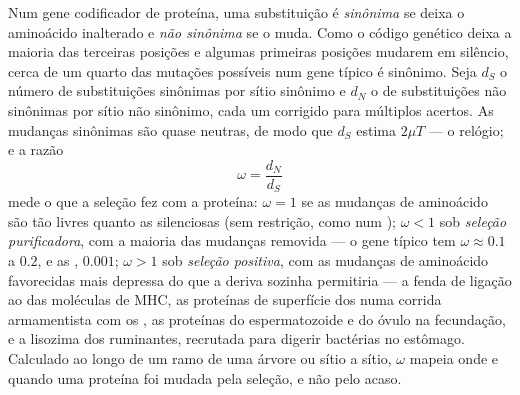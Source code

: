 \begin{definition}[dN/dS]\label{def:b3:molecular-evolution:dnds}
Num gene codificador de proteína, uma substituição é \emph{sinônima} se
deixa o aminoácido inalterado e \emph{não sinônima} se o muda. Como o
código genético deixa a maioria das terceiras posições e algumas
primeiras posições mudarem em silêncio, cerca de um quarto das mutações
possíveis num gene típico é sinônimo. Seja $d_{S}$ o número de
substituições sinônimas por sítio sinônimo e $d_{N}$ o de substituições
não sinônimas por sítio não sinônimo, cada um corrigido para múltiplos
acertos. As mudanças sinônimas são quase neutras, de modo que $d_{S}$
estima $2\mu T$ --- o relógio; e a razão
\[
\omega = \frac{d_{N}}{d_{S}}
\]
mede o que a seleção fez com a proteína: $\omega = 1$ se as mudanças de
aminoácido são tão livres quanto as silenciosas (sem restrição, como num
); $\omega < 1$ sob \emph{seleção purificadora}, com a maioria
das mudanças removida --- o gene típico tem $\omega \approx 0.1$ a
$0.2$, e as , $0.001$; $\omega > 1$ sob \emph{seleção positiva},
com as mudanças de aminoácido favorecidas mais depressa do que a deriva
sozinha permitiria --- a fenda de ligação ao  das moléculas de
MHC, as proteínas de superfície dos  numa corrida armamentista com
os , as proteínas do espermatozoide e do óvulo na fecundação, e
a lisozima dos ruminantes, recrutada para digerir bactérias no estômago.
Calculado ao longo de um ramo de uma árvore ou sítio a sítio, $\omega$
mapeia onde e quando uma proteína foi mudada pela seleção, e não pelo
acaso.
\end{definition}

